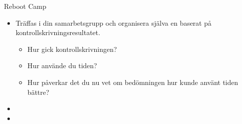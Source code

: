 \begin{Slide}{Reboot Camp}

\begin{itemize}
  \item
  Träffas i din samarbetsgrupp och organisera själva en  baserat på kontrollskrivningsresultatet.

  \begin{itemize}
    \item Hur gick kontrollskrivningen?
    \item Hur använde du tiden?
    \item Hur påverkar det du nu vet om bedömningen hur kunde använt tiden bättre?
  \end{itemize}
  
    
    \item {} 
    \item {}
\end{itemize}


\end{Slide}

